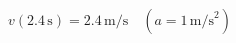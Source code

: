 \documentclass[preview]{standalone}
\begin{document}
\begin{align*}
v(2.4\,\text{s}) = 2.4\,\text{m/s} \quad (a=1\,\text{m/s}^2)
\end{align*}
\end{document}
